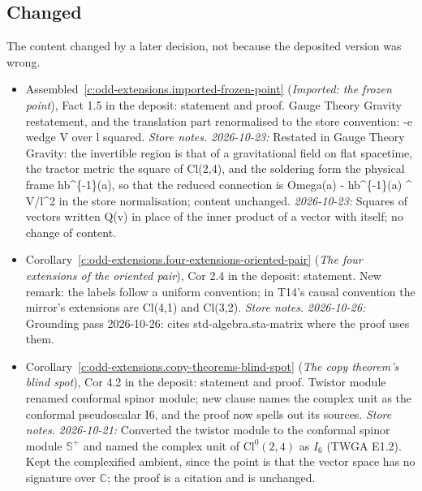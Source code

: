 \documentclass[11pt]{article}
\theoremstyle{definition}
\theoremstyle{plain}
\providecommand{\C}{}\renewcommand{\C}{\mathbb{C}}
\providecommand{\CS}{}\renewcommand{\CS}{{\mathbb{S}^{+}}}
\providecommand{\Cl}{}\renewcommand{\Cl}{\mathrm{Cl}}
\begin{document}
\subsection*{Changed}
The content changed by a later decision, not because the deposited version was wrong.
\begin{itemize}\setlength{\itemsep}{2pt}
\item Assembled~\ref{c:odd-extensions.imported-frozen-point} (\emph{Imported: the frozen point}), Fact 1.5 in the deposit: statement and proof. Gauge Theory Gravity restatement, and the translation part renormalised to the store convention: -e wedge V over l squared. \emph{Store notes.} \emph{2026-10-23:} Restated in Gauge Theory Gravity: the invertible region is that of a gravitational field on flat spacetime, the tractor metric the square of Cl(2,4), and the soldering form the physical frame hb\^{}\{-1\}(a), so that the reduced connection is Omega(a) - hb\^{}\{-1\}(a) \^{} V/l\^{}2 in the store normalisation; content unchanged. \emph{2026-10-23:} Squares of vectors written Q(v) in place of the inner product of a vector with itself; no change of content.
\item Corollary~\ref{c:odd-extensions.four-extensions-oriented-pair} (\emph{The four extensions of the oriented pair}), Cor 2.4 in the deposit: statement. New remark: the labels follow a uniform convention; in T14's causal convention the mirror's extensions are Cl(4,1) and Cl(3,2). \emph{Store notes.} \emph{2026-10-26:} Grounding pass 2026-10-26: cites std-algebra.sta-matrix where the proof uses them.
\item Corollary~\ref{c:odd-extensions.copy-theorems-blind-spot} (\emph{The copy theorem's blind spot}), Cor 4.2 in the deposit: statement and proof. Twistor module renamed conformal spinor module; new clause names the complex unit as the conformal pseudoscalar I6, and the proof now spells out its sources. \emph{Store notes.} \emph{2026-10-21:} Converted the twistor module to the conformal spinor module $\CS$ and named the complex unit of $\Cl^0(2,4)$ as $I_6$ (TWGA E1.2). Kept the complexified ambient, since the point is that the vector space has no signature over $\C$; the proof is a citation and is unchanged.
\end{itemize}
\end{document}
